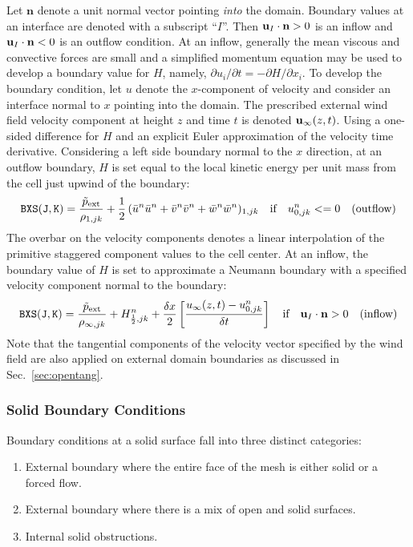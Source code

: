 Let $\mathbf{n}$ denote a unit normal vector pointing \emph{into} the domain.  Boundary values at an interface are denoted with a subscript ``$I$''.  Then ${\mathbf{u}}_I\cdot\mathbf{n}>0$ is an inflow and ${\mathbf{u}}_I\cdot\mathbf{n}<0$ is an outflow condition. At an inflow, generally the mean viscous and convective forces are small and a simplified momentum equation may be used to develop a boundary value for $H$, namely, $\partial u_i/\partial t = -\partial H/\partial x_i$. To develop the boundary condition, let $u$ denote the $x$-component of velocity and consider an interface normal to $x$ pointing into the domain.  The prescribed external wind field velocity component at height $z$ and time $t$ is denoted ${\mathbf{u}}_\infty(z,t)$.  Using a one-sided difference for $H$ and an explicit Euler approximation of the velocity time derivative.  Considering a left side boundary normal to the $x$ direction, at an outflow boundary, $H$ is set equal to the local kinetic energy per unit mass from the cell just upwind of the boundary:
\begin{equation}
\label{eq:Hout}
\mathtt{BXS(J,K)} = \frac{\tilde{p}_{\rm ext}}{\rho_{1,jk}} + \frac{1}{2}\,(\bar{u}^n \bar{u}^n + \bar{v}^n \bar{v}^n + \bar{w}^n \bar{w}^n)_{1,jk} \quad \mbox{if} \quad u_{0,jk}^n<=0 \quad \mbox{(outflow)}
\end{equation}
The overbar on the velocity components denotes a linear interpolation of the primitive staggered component values to the cell center.  At an inflow, the boundary value of $H$ is set to approximate a Neumann boundary with a specified velocity component normal to the boundary:
\begin{equation}
\label{eq:Hin}
\mathtt{BXS(J,K)} = \frac{\tilde{p}_{\rm ext}}{\rho_{\infty,jk}} + H_{\frac{1}{2},jk}^n + \frac{\delta x}{2}\left[\frac{u_\infty(z,t) - u_{0,jk}^n}{\delta t}\right] \quad \mbox{if} \quad \mathbf{u}_I\cdot\mathbf{n}>0 \quad \mbox{(inflow)}
\end{equation}
Note that the tangential components of the velocity vector specified by the wind field are also applied on external domain boundaries as discussed in Sec.~\ref{sec:opentang}.


\subsubsection{Solid Boundary Conditions}

Boundary conditions at a solid surface fall into three distinct categories:
\begin{enumerate}
\item External boundary where the entire face of the mesh is either solid or a forced flow.
\item External boundary where there is a mix of open and solid surfaces.
\item Internal solid obstructions.
\end{enumerate}

